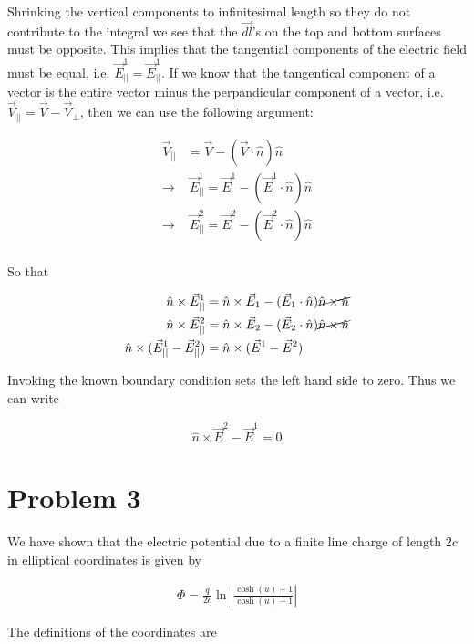 \documentclass[paper=a4, fontsize=11pt]{scrartcl} %
\numberwithin{equation}{section} %
\numberwithin{figure}{section} %
\numberwithin{table}{section} %
\begin{document}
Shrinking the vertical components to infinitesimal length so they do not contribute to the integral we see that the $\vec{dl}$'s on the top and bottom surfaces must be opposite. This implies that the tangential components of the electric field must be equal, i.e. $\vec{E}_{||}^1 = \vec{E}_{||}^1$. If we know that the tangentical component of a vector is the entire vector minus the perpandicular component of a vector, i.e. $\vec{V}_{||} = \vec{V} - \vec{V}_{\perp}$, then we can use the following argument:

\begin{align}
\vec{V}_{||} &= \vec{V} - (\vec{V}\cdot\hat{n})\hat{n} \\
\rightarrow & \  \vec{E}_{||}^1 = \vec{E}^1 - (\vec{E}^1 \cdot\hat{n})\hat{n} \\
\rightarrow & \  \vec{E}_{||}^2 = \vec{E}^2 - (\vec{E}^2 \cdot\hat{n})\hat{n} \\
\end{align}

So that 

\begin{align}
\hat{n} \times \vec{E}_{||}^1 &= \hat{n} \times \vec{E}_1 - (\vec{E}_1 \cdot \hat{n})\cancel{\hat{n} \times \hat{n}} \\
\hat{n} \times \vec{E}_{||}^2 &= \hat{n} \times \vec{E}_2 - (\vec{E}_2 \cdot \hat{n})\cancel{\hat{n} \times \hat{n}} \\
\hat{n} \times (\vec{E}_{||}^1 - \vec{E}_{||}^2) &= \hat{n} \times (\vec{E}^1 - \vec{E}^2)
\end{align}

Invoking the known boundary condition sets the left hand side to zero. Thus we can write

\begin{align}
\hat{n} \times \vec{E}^2 - \vec{E}^1 = 0
\end{align}

\section{Problem 3}

We have shown that the electric potential due to a finite line charge of length $2c$ in elliptical coordinates is given by

\begin{align}
\Phi = \frac{q}{2c}\ln\left|\frac{\cosh(u) + 1}{\cosh(u) - 1}\right|
\end{align}

The definitions of the coordinates are 
\end{document}
